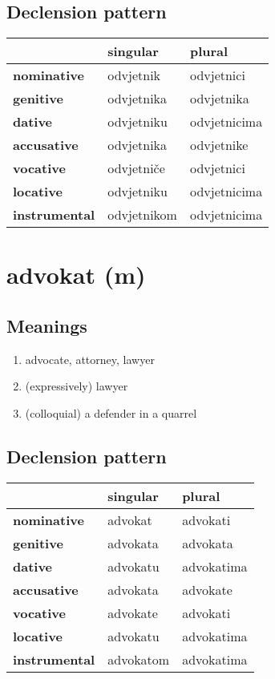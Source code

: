 \subsection*{Declension pattern}
\begin{tabularx}{\linewidth}{Xll}
\toprule
{} &     singular &        plural \\
\midrule
\textbf{nominative  } &    odvjetnik &    odvjetnici \\
\textbf{genitive    } &   odvjetnika &    odvjetnika \\
\textbf{dative      } &   odvjetniku &  odvjetnicima \\
\textbf{accusative  } &   odvjetnika &    odvjetnike \\
\textbf{vocative    } &   odvjetniče &    odvjetnici \\
\textbf{locative    } &   odvjetniku &  odvjetnicima \\
\textbf{instrumental} &  odvjetnikom &  odvjetnicima \\
\bottomrule
\end{tabularx}

\filbreak
\section{advokat (m)}
\subsection*{Meanings}
\begin{enumerate}
\item advocate, attorney, lawyer
\item (expressively) lawyer
\item (colloquial) a defender in a quarrel
\end{enumerate}
\subsection*{Declension pattern}
\begin{tabularx}{\linewidth}{Xll}
\toprule
{} &   singular &      plural \\
\midrule
\textbf{nominative  } &    advokat &    advokati \\
\textbf{genitive    } &   advokata &    advokata \\
\textbf{dative      } &   advokatu &  advokatima \\
\textbf{accusative  } &   advokata &    advokate \\
\textbf{vocative    } &   advokate &    advokati \\
\textbf{locative    } &   advokatu &  advokatima \\
\textbf{instrumental} &  advokatom &  advokatima \\
\bottomrule
\end{tabularx}

